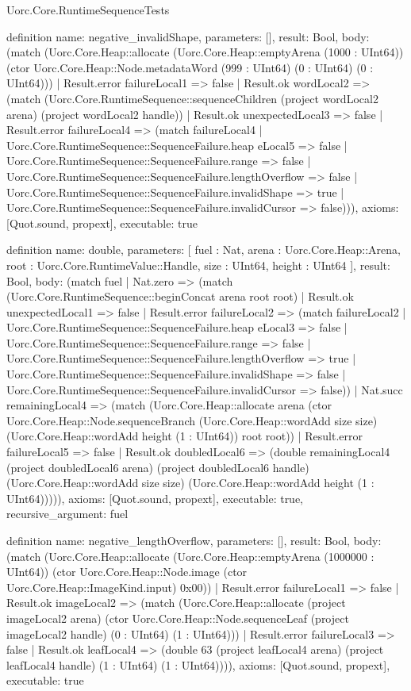 \begin{lexlean}{Uorc.Core.RuntimeSequenceTests}
\begin{semanticmodule}
definition{
  name: negative_invalidShape,
  parameters: [],
  result: Bool,
  body: (match (Uorc.Core.Heap::allocate (Uorc.Core.Heap::emptyArena (1000 : UInt64)) (ctor Uorc.Core.Heap::Node.metadataWord (999 : UInt64) (0 : UInt64) (0 : UInt64)))
    | Result.error failureLocal1 => false
    | Result.ok wordLocal2 => (match (Uorc.Core.RuntimeSequence::sequenceChildren (project wordLocal2 arena) (project wordLocal2 handle))
      | Result.ok unexpectedLocal3 => false
      | Result.error failureLocal4 => (match failureLocal4
        | Uorc.Core.RuntimeSequence::SequenceFailure.heap eLocal5 => false
        | Uorc.Core.RuntimeSequence::SequenceFailure.range => false
        | Uorc.Core.RuntimeSequence::SequenceFailure.lengthOverflow => false
        | Uorc.Core.RuntimeSequence::SequenceFailure.invalidShape => true
        | Uorc.Core.RuntimeSequence::SequenceFailure.invalidCursor => false))),
  axioms: [Quot.sound, propext],
  executable: true
}

definition{
  name: double,
  parameters: [
    fuel : Nat,
    arena : Uorc.Core.Heap::Arena,
    root : Uorc.Core.RuntimeValue::Handle,
    size : UInt64,
    height : UInt64
  ],
  result: Bool,
  body: (match fuel
    | Nat.zero => (match (Uorc.Core.RuntimeSequence::beginConcat arena root root)
      | Result.ok unexpectedLocal1 => false
      | Result.error failureLocal2 => (match failureLocal2
        | Uorc.Core.RuntimeSequence::SequenceFailure.heap eLocal3 => false
        | Uorc.Core.RuntimeSequence::SequenceFailure.range => false
        | Uorc.Core.RuntimeSequence::SequenceFailure.lengthOverflow => true
        | Uorc.Core.RuntimeSequence::SequenceFailure.invalidShape => false
        | Uorc.Core.RuntimeSequence::SequenceFailure.invalidCursor => false))
    | Nat.succ remainingLocal4 => (match (Uorc.Core.Heap::allocate arena (ctor Uorc.Core.Heap::Node.sequenceBranch (Uorc.Core.Heap::wordAdd size size) (Uorc.Core.Heap::wordAdd height (1 : UInt64)) root root))
      | Result.error failureLocal5 => false
      | Result.ok doubledLocal6 => (double remainingLocal4 (project doubledLocal6 arena) (project doubledLocal6 handle) (Uorc.Core.Heap::wordAdd size size) (Uorc.Core.Heap::wordAdd height (1 : UInt64))))),
  axioms: [Quot.sound, propext],
  executable: true,
  recursive_argument: fuel
}

definition{
  name: negative_lengthOverflow,
  parameters: [],
  result: Bool,
  body: (match (Uorc.Core.Heap::allocate (Uorc.Core.Heap::emptyArena (1000000 : UInt64)) (ctor Uorc.Core.Heap::Node.image (ctor Uorc.Core.Heap::ImageKind.input) 0x00))
    | Result.error failureLocal1 => false
    | Result.ok imageLocal2 => (match (Uorc.Core.Heap::allocate (project imageLocal2 arena) (ctor Uorc.Core.Heap::Node.sequenceLeaf (project imageLocal2 handle) (0 : UInt64) (1 : UInt64)))
      | Result.error failureLocal3 => false
      | Result.ok leafLocal4 => (double 63 (project leafLocal4 arena) (project leafLocal4 handle) (1 : UInt64) (1 : UInt64)))),
  axioms: [Quot.sound, propext],
  executable: true
}


\end{semanticmodule}
\end{lexlean}
